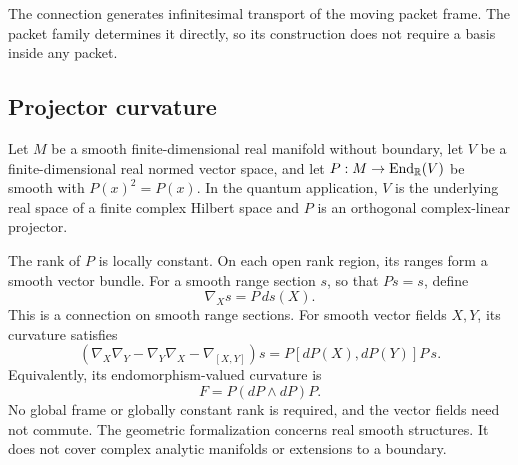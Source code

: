 The connection generates infinitesimal transport of the moving packet frame. The packet family determines it directly, so its construction does not require a basis inside any packet.

\subsection{Projector curvature}

\begin{classical}\label{core:classical:001}\label{core:thm:projected}
Let $M$ be a smooth finite-dimensional real manifold without boundary, let $V$ be a finite-dimensional real normed vector space, and let $P:M\to\operatorname{End}_{\bbR}(V)$ be smooth with $P(x)^2=P(x)$. In the quantum application, $V$ is the underlying real space of a finite complex Hilbert space and $P$ is an orthogonal complex-linear projector.

The rank of $P$ is locally constant. On each open rank region, its ranges form a smooth vector bundle. For a smooth range section $s$, so that $Ps=s$, define
\[
\nabla_Xs=P\,ds(X).
\]
This is a connection on smooth range sections. For smooth vector fields $X,Y$, its curvature satisfies
\[
\boxed{
(\nabla_X\nabla_Y-\nabla_Y\nabla_X-\nabla_{[X,Y]})s
=P[dP(X),dP(Y)]P\,s.
}
\]
Equivalently, its endomorphism-valued curvature is
\[
\boxed{F=P(dP\wedge dP)P.}
\]
No global frame or globally constant rank is required, and the vector fields need not commute. The geometric formalization concerns real smooth structures. It does not cover complex analytic manifolds or extensions to a boundary.
\end{classical}

